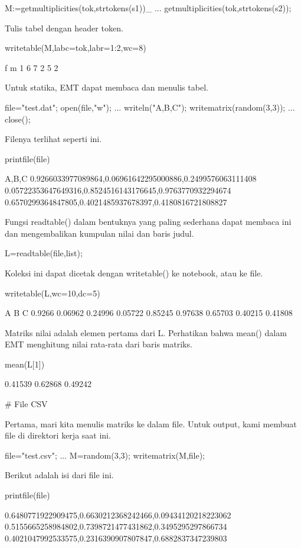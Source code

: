 \documentclass{article}
\begin{document}
\>M:=getmultiplicities(tok,strtokens(s1))\_ ...  
\>     getmultiplicities(tok,strtokens(s2));


Tulis tabel dengan header token.


\>writetable(M,labc=tok,labr=1:2,wc=8)


                   f       m
           1       6       7
           2       5       2

Untuk statika, EMT dapat membaca dan menulis tabel.


\>file="test.dat"; open(file,"w"); ...  
\>   writeln("A,B,C"); writematrix(random(3,3)); ...  
\>   close();


Filenya terlihat seperti ini.


\>printfile(file)


    A,B,C
    0.9266033977089864,0.06961642295000886,0.2499576063111408
    0.05722353647649316,0.8524516143176645,0.9763770932294674
    0.6570299364847805,0.4021485937678397,0.4180816721808827
    

Fungsi readtable() dalam bentuknya yang paling sederhana dapat membaca
ini dan mengembalikan kumpulan nilai dan baris judul.


\>L=readtable(file,\>list);


Koleksi ini dapat dicetak dengan writetable() ke notebook, atau ke
file.


\>writetable(L,wc=10,dc=5)


             A         B         C
        0.9266   0.06962   0.24996
       0.05722   0.85245   0.97638
       0.65703   0.40215   0.41808

Matriks nilai adalah elemen pertama dari L. Perhatikan bahwa mean()
dalam EMT menghitung nilai rata-rata dari baris matriks.


\>mean(L[1])


      0.41539 
      0.62868 
      0.49242 

# File CSV

Pertama, mari kita menulis matriks ke dalam file. Untuk output, kami
membuat file di direktori kerja saat ini.


\>file="test.csv";  ...  
\>   M=random(3,3); writematrix(M,file);


Berikut adalah isi dari file ini.


\>printfile(file)


    0.6480771922909475,0.6630212368242466,0.09434120218223062
    0.5155665258984802,0.7398721477431862,0.3495295297866734
    0.4021047992533575,0.2316390907807847,0.6882837347239803
    
\end{document}
